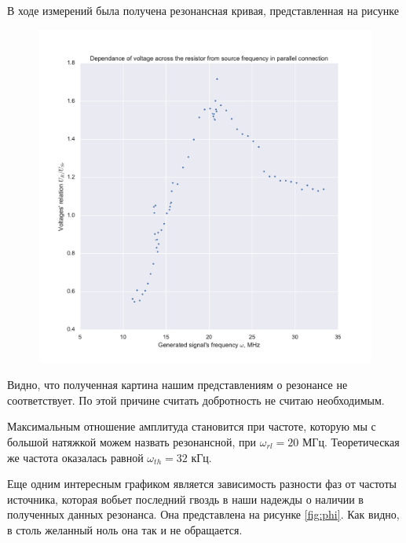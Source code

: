 \documentclass[a4paper, 12pt]{article}
\begin{document}
В ходе измерений была получена резонансная кривая, представленная на рисунке

\begin{figure}[h!]
	\centering
	\includegraphics[width=\textwidth]{Parallel}
\end{figure}

Видно, что полученная картина нашим представлениям о резонансе не соответствует. По этой причине считать добротность не считаю необходимым.

Максимальным отношение амплитуда становится при частоте, которую мы с большой натяжкой можем назвать резонансной, при $\boxed{\omega_{rl} = 20 \text{ МГц}}$. Теоретическая же частота оказалась равной $\boxed{\omega_{th} = 32 \text{ кГц}}$. 

Еще одним интересным графиком является зависимость разности фаз от частоты источника, которая вобьет последний гвоздь в наши надежды о наличии в полученных данных резонанса. Она представлена на рисунке \ref{fig:phi}. Как видно, в столь желанный ноль она так и не обращается.
\end{document}
